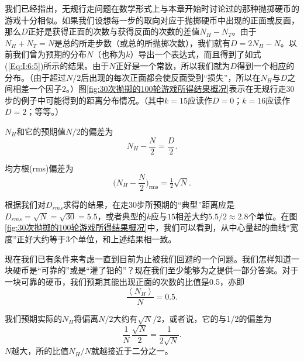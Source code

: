 \documentclass[12pt,oneside]{book}
\begin{document}
\begin{common-format}
我们已经指出，无规行走问题在数学形式上与本章开始时讨论过的那种抛掷硬币的游戏十分相似。如果我们设想每一步的取向对应于抛掷硬币中出现的正面或反面，那么$D$正好是获得正面的次数与获得反面的次数的差值$N_H-N_T$。由于$N_H+N_T=N$是总的所走步数（或总的所抛掷次数），我们就有$D=2N_H-N$。以前我们曾为预期的分布$N$（也称为$k$）导出一个表达式，而且得到了如式(\ref{Eq:I:6:5})所示的结果。由于$N$正好是一个常数，所以我们就为$D$得到一个相应的分布。（由于超过$N/2$后出现的每次正面都会使反面受到“损失”，所以在$N_H$与$D$之间相差一个因子$2$。）图\ref{fig:30次抛掷的100轮游戏所得结果概况}表示在无规行走30步的例子中可能得到的距离分布情况。（其中$k=15$应读作$D=0$；$k=16$应读作$D=2$；等等。）

$N_H$和它的预期值$N/2$的偏差为
\begin{equation}
\label{Eq:I:6:11}
N_H-\frac{N}{2}=\frac{D}{2}.
\end{equation}

均方根(rms)偏差为
\begin{equation}
\label{Eq:I:6:12}
\biggl(N_H-\frac{N}{2}\biggr)_{\text{rms}}=\tfrac{1}{2}\sqrt{N}.
\end{equation}

根据我们对$D_{rms}$求得的结果，在走30步所预期的“典型”距离应是$D_{rms}=\sqrt{N}=\sqrt{30}=5.5$，或者典型的$k$应与$15$相差大约$5.5/2 \approx 2.8$个单位。在图\ref{fig:30次抛掷的100轮游戏所得结果概况}中，我们可以看到，从中心量起的曲线“宽度”正好大约等于3个单位，和上述结果相一致。

现在我们已有条件来考虑一直到目前为止被我们回避的一个问题。我们怎样知道一块硬币是“可靠的”或是“灌了铅的”？现在我们至少能够为之提供一部分答案。对于一块可靠的硬币，我们预期其能出现正面的次数的比值是0.5，亦即
\begin{equation}
\label{Eq:I:6:13}
\frac{\left < N_H \right > }{N}=0.5.
\end{equation}

我们预期实际的$N_H$将偏离$N/2$大约有$\sqrt{N}/2$，或者说，它的与1/2的偏差为
\begin{equation*}
\frac{1}{N}\,\frac{\sqrt{N}}{2}=\frac{1}{2\sqrt{N}}.
\end{equation*}
$N$越大，所的比值$N_H/N$就越接近于二分之一。


\end{common-format}
\end{document}

